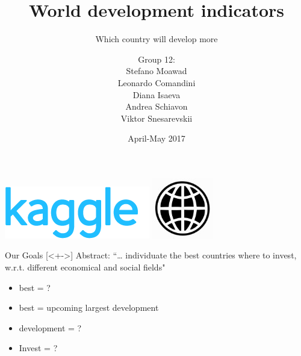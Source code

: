 \documentclass[10pt]{beamer}
\title[World development indicators]{\huge World development indicators}
\subtitle[Which country will develop more]{\large Which country will develop more}
\author[Moawad, Commandi, Isaeva, Schiavon, Snesarevskii] {{\Large Group 12:\\}Stefano Moawad\\Leonardo Comandini\\Diana Isaeva\\Andrea Schiavon\\Viktor Snesarevskii}
\date{April-May 2017}
\begin{document}
\begin{frame}
\titlepage
\vfill
\begin{flushright}
\includegraphics[height=.7cm]{kaggle.png}\quad
\includegraphics[height=.7cm]{worldbank.jpg}
\end{flushright}
\end{frame}

\begin{frame}{Our Goals} [<+->]%
	Abstract: “… individuate the best countries where to invest, w.r.t. different economical and social fields"
	\begin{itemize}
		\item best = ? \\
		\item best = upcoming largest development
		\item development = ?
		\item Invest = ?
	\end{itemize}
\end{frame}
\end{document}
